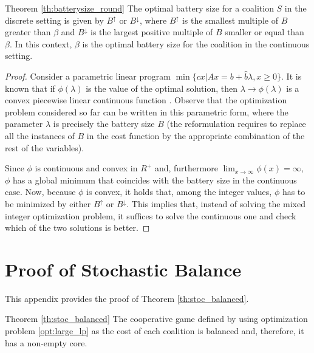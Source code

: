 \documentclass[sigconf, table]{acmart}
\newcommand{\bat}{B}
\begin{document}
\begin{paragraph}{Theorem \ref{th:batterysize_round}}
The optimal battery size for a coalition $S$ in the discrete setting is given by $B^{\uparrow}$ or $B^{\downarrow}$, where $B^{\uparrow}$ is the smallest multiple of $B$ greater than $\beta$ and $B^{\downarrow}$ is the largest positive multiple of $B$ smaller or equal than $\beta$. In this context, $\beta$ is the optimal battery size for the coalition in the continuous setting.
\end{paragraph}
\begin{proof}
Consider a parametric linear program $\min\{ cx | Ax = b + \hat{b}\lambda, x\geq 0\}$. It is known that if $\phi(\lambda)$ is the value of the optimal solution, then $\lambda \to \phi(\lambda)$ is a convex piecewise linear continuous function \cite{Adler1992}.
Observe that the optimization problem considered so far can be written in this parametric form, where the parameter $\lambda$ is precisely the battery size $\bat$ (the reformulation requires to replace all the instances of $\bat$ in the cost function by the appropriate combination of the rest of the variables).

Since $\phi$ is continuous and convex in $R^+$ and, furthermore
$\lim_{x\to\infty} \phi(x) = \infty$, $\phi$ has a global minimum that coincides with the battery size in the continuous case. Now, because $\phi$ is convex, it holds that, among the integer values, $\phi$ has to be minimized by either $\bat^{\uparrow}$ or $\bat^{\downarrow}$. This implies that, instead of solving the mixed integer optimization problem, it suffices to solve the continuous one and check which of the two solutions is better.
\end{proof}

\section{Proof of Stochastic Balance}\label{app:stoc_balanced}

This appendix provides the proof of Theorem \ref{th:stoc_balanced}.

\begin{paragraph}{Theorem \ref{th:stoc_balanced}}
The cooperative game defined by using optimization problem \eqref{opt:large_lp} as the cost of each coalition is balanced and, therefore, it has a non-empty core. 
\end{paragraph}
\end{document}
